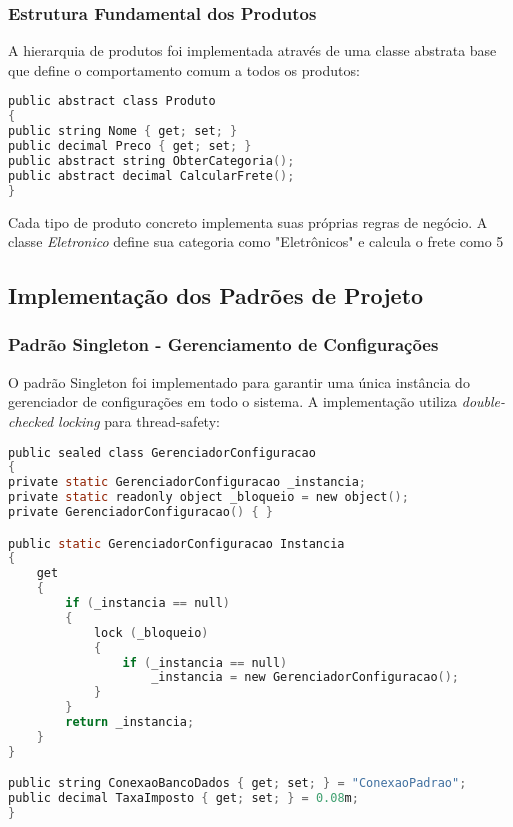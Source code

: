 \documentclass[
	12pt,				%
	oneside,			%
	a4paper,			%
	english,			%
	brazil,				%
	]{abntex2}
\begin{document}
{\subsubsection{Estrutura Fundamental dos Produtos}
A hierarquia de produtos foi implementada através de uma classe abstrata base que define o comportamento comum a todos os produtos:
\begin{lstlisting}[language=C]
public abstract class Produto
{
public string Nome { get; set; }
public decimal Preco { get; set; }
public abstract string ObterCategoria();
public abstract decimal CalcularFrete();
}
\end{lstlisting}
Cada tipo de produto concreto implementa suas próprias regras de negócio. A classe \textit{Eletronico} define sua categoria como "Eletrônicos" e calcula o frete como 5%
\subsection{Implementação dos Padrões de Projeto}
\subsubsection{Padrão Singleton - Gerenciamento de Configurações}
O padrão Singleton foi implementado para garantir uma única instância do gerenciador de configurações em todo o sistema. A implementação utiliza \textit{double-checked locking} para thread-safety:
\begin{lstlisting}[language=C]
public sealed class GerenciadorConfiguracao
{
private static GerenciadorConfiguracao _instancia;
private static readonly object _bloqueio = new object();
private GerenciadorConfiguracao() { }

public static GerenciadorConfiguracao Instancia
{
    get
    {
        if (_instancia == null)
        {
            lock (_bloqueio)
            {
                if (_instancia == null)
                    _instancia = new GerenciadorConfiguracao();
            }
        }
        return _instancia;
    }
}

public string ConexaoBancoDados { get; set; } = "ConexaoPadrao";
public decimal TaxaImposto { get; set; } = 0.08m;
}
\end{lstlisting}
}
\end{document}
